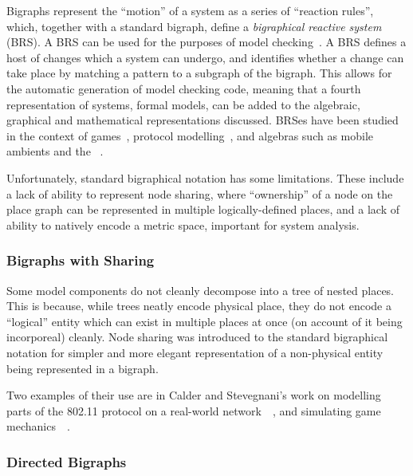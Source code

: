 \documentclass[draft,12pt]{article}
\begin{document}
Bigraphs represent the ``motion'' of a system as a series of ``reaction rules'',
which, together with a standard bigraph, define a \emph{bigraphical reactive
  system} (BRS). A BRS can be used for the purposes of model
checking~\cite{sevegnani2015bigraphs,perrone2012model}. A BRS defines a host of
changes which a system can undergo, and identifies whether a change can take
place by matching a pattern to a subgraph of the bigraph. This allows for the
automatic generation of model checking code, meaning that a fourth
representation of systems, formal models, can be added to the algebraic,
graphical and mathematical representations discussed. BRSes have been studied in
the context of games~\cite{benford2016lions}, protocol
modelling~\cite{calder2014modelling}, and algebras such as mobile
ambients and the \picalculus{}~\cite{milner2001bigraphical}.
\par

Unfortunately, standard bigraphical notation has some limitations. These include
a lack of ability to represent node sharing, where ``ownership'' of a node on
the place graph can be represented in multiple logically-defined places, and a
lack of ability to natively encode a metric space, important for system analysis.
\par

\subsubsection{Bigraphs with Sharing}

Some model components do not cleanly decompose into a tree of nested places.
This is because, while trees neatly encode physical place, they do not encode a
``logical'' entity which can exist in multiple places at once (on account of it
being incorporeal) cleanly. Node sharing was introduced to the standard
bigraphical notation for simpler and more elegant representation of a
non-physical entity being represented in a bigraph. 
\par

Two examples of their use are in Calder and Stevegnani's work on modelling parts
of the 802.11 protocol on a real-world network~\cite{calder2014modelling}~, and
simulating game mechanics~\cite{benford2016lions}~. 

\subsubsection{Directed Bigraphs}
\label{sec:review-directed-bigraphs}
\end{document}

